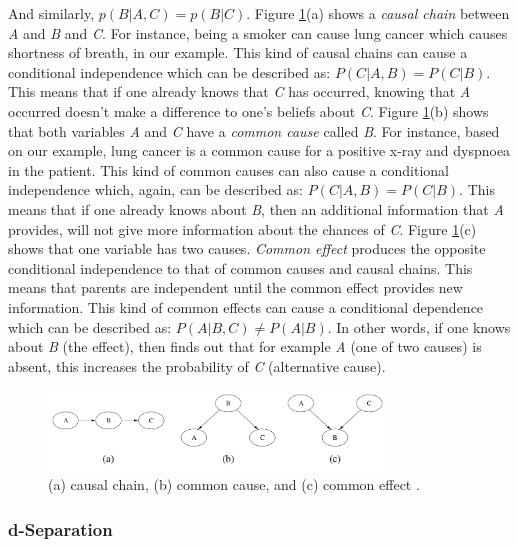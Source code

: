 \documentclass[11pt]{article}
\begin{document}
\noindent And similarly, $p(B|A,C) = p(B|C)$. Figure
\ref{fig:conditional-independence}(a) shows a \textit{causal chain} between
\textit{A} and \textit{B} and \textit{C}. For instance, being a smoker can cause
lung cancer which causes shortness of breath, in our example. This kind of
causal chains can cause a conditional independence which can be described as:
$P(C|A,B) = P(C|B)$. This means that if one already knows that \textit{C} has
occurred, knowing that \textit{A} occurred doesn’t make a difference to one's
beliefs about \textit{C}. Figure \ref{fig:conditional-independence}(b) shows
that both variables \textit{A} and \textit{C} have a \textit{common cause}
called \textit{B}. For instance, based on our example, lung cancer is a common
cause for a positive x-ray and dyspnoea in the patient. This kind of common
causes can also cause a conditional independence which, again, can be described
as: $P(C|A,B) = P(C|B)$. This means that if one already knows about \textit{B},
then an additional information that \textit{A} provides, will not give more
information about the chances of \textit{C}. Figure
\ref{fig:conditional-independence}(c) shows that one variable has two causes.
\textit{Common effect} produces the opposite conditional independence to that of
common causes and causal chains. This means that parents are independent until
the common effect provides new information. This kind of common effects can
cause a conditional dependence which can be described as: $P(A|B,C) \neq
P(A|B)$. In other words, if one knows about \textit{B} (the effect), then finds
out that for example \textit{A} (one of two causes) is absent, this increases
the probability of \textit{C} (alternative cause).

\begin{figure}[tbh]
  \center
  \includegraphics[width=0.8\textwidth]{figure/conditional-independence.png}
  \caption{(a) causal chain, (b) common cause, and (c) common effect
  \cite{korb:bayesian-ai}.}
  \label{fig:conditional-independence}
\end{figure}

\subsubsection{d-Separation}
\end{document}
